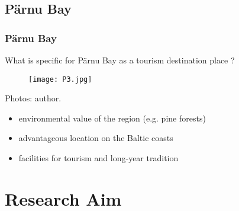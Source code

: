 \documentclass[pdflatex,compress,8pt,
	xcolor={dvipsnames,dvipsnames,svgnames,x11names,table},
	hyperref={	
	breaklinks = true, 
	pdfauthor={Lemenkova Polina}, 
	pdfsubject={Preentation}, 
	pdfcreator={Lemenkova Polina}, 
	pdfproducer={Lemenkova Polina}, 
	colorlinks=true,
	linkcolor=Tomato, 
	citecolor=DeepPink3, 
	urlcolor = NavyBlue, 
	breaklinks = true}]{beamer}
\begin{document}
\subsection{Pärnu Bay}
\begin{frame}\frametitle{Pärnu Bay}
\vspace{3em}
 What is specific for Pärnu Bay as a tourism destination place ?
\begin{figure}[H]
	\centering
		\texttt{[image: P3.jpg]}
\end{figure}
Photos: author.
\small{
\begin{itemize}
	\item environmental value of the region (e.g. pine forests) 
	\item advantageous location on the Baltic coasts
	\item facilities for tourism and long-year tradition
\end{itemize}
}
\end{frame} 

\section{Research Aim}
\end{document}
